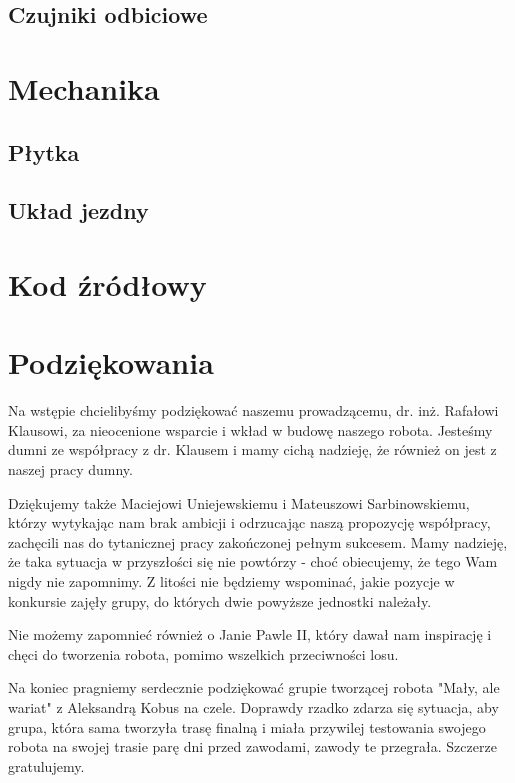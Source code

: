 \documentclass{article}
\begin{document}
\subsection{Czujniki odbiciowe}


\section{Mechanika}

\subsection{Płytka}


\subsection{Układ jezdny}


\section{Kod źródłowy}



\section{Podziękowania}

Na wstępie chcielibyśmy podziękować naszemu prowadzącemu, dr. inż. Rafałowi Klausowi,  za nieocenione wsparcie i wkład w budowę naszego robota. Jesteśmy dumni ze współpracy z dr. Klausem i mamy cichą nadzieję, że również on jest z naszej pracy dumny.

Dziękujemy także Maciejowi Uniejewskiemu i Mateuszowi Sarbinowskiemu, którzy  wytykając nam brak ambicji i odrzucając naszą propozycję współpracy, zachęcili nas do tytanicznej pracy zakończonej pełnym sukcesem. Mamy nadzieję, że taka sytuacja w przyszłości się nie powtórzy - choć obiecujemy, że tego Wam nigdy nie zapomnimy. Z litości nie będziemy wspominać, jakie pozycje w konkursie zajęły grupy, do których dwie powyższe jednostki należały.

Nie możemy zapomnieć również o Janie Pawle II, który dawał nam inspirację i chęci do tworzenia robota, pomimo wszelkich przeciwności losu.

Na koniec pragniemy serdecznie podziękować grupie tworzącej robota "Mały, ale wariat" z Aleksandrą Kobus na czele. Doprawdy rzadko zdarza się sytuacja, aby grupa, która sama tworzyła trasę finalną i miała przywilej testowania swojego robota na swojej trasie parę dni przed zawodami, zawody te przegrała. Szczerze gratulujemy.


\end{document}
